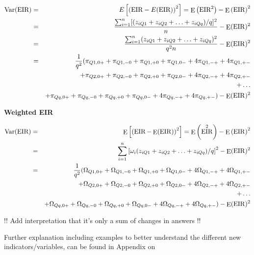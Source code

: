 \documentclass[12pt,a4paper,oneside]{book}
\DeclareMathOperator{\Var}{Var}
\DeclareMathOperator{\E}{E}
\DeclareMathOperator{\EIR}{EIR}
\begin{document}
\begin{eqnarray}
         \Var(\text{EIR}) &=& E \left[ \left(\text{EIR}-E(\text{EIR}) \right)^2 \right] =  \E \left( \text{EIR}^2\right) - \E \left( \text{EIR}\right)^2 \\ 
         &=&  \frac{\sum^n_{i=1}[(z_{iQ1} + z_{iQ2} + \ldots + z_{iQq})/q]^2}{n} - \E (\EIR)^2 \\
        &=&  \frac{\sum^n_{i=1}(z_{iQ1} + z_{iQ2} + \ldots + z_{iQq})^2}{q^2 n} - \E (\EIR)^2 \\
        &=& \frac{1}{q^2} \Large( \pi_{Q1,0+} + \pi_{Q1,-0} + \pi_{Q1,+0} + \pi_{Q1,0-} +4\pi_{Q1,-+} +4\pi_{Q1,+-} \nonumber \\ 
        && + \pi_{Q2,0+} + \pi_{Q2,-0} + \pi_{Q2,+0} + \pi_{Q2,0-} +4\pi_{Q2,-+} +4\pi_{Q2,+-} \nonumber \\ 
        &&  + \ldots \nonumber \\ 
        && + \pi_{Qq,0+} + \pi_{Qq,-0} + \pi_{Qq,+0} + \pi_{Qq,0-} +4\pi_{Qq,-+} +4\pi_{Qq,+-} \Large) - \E (\EIR)^2 \nonumber \\ 
\end{eqnarray}

\textbf{Weighted EIR}

\begin{eqnarray}
         \Var(\text{EIR}) &=& \E \left[ \left( \EIR - \E(\EIR) \right)^2 \right] =  \E \left( \EIR^2\right) - \E \left( \EIR \right)^2 \\ 
         &=&  \sum^n_{i=1} \left[\omega_i (z_{iQ1} + z_{iQ2} + \ldots + z_{iQq})/q \right]^2 - \E (\EIR)^2 \\
        &=& \frac{1}{q^2} \Large( \Omega_{Q1,0+} + \Omega_{Q1,-0} + \Omega_{Q1,+0} + \Omega_{Q1,0-} +4\Omega_{Q1,-+} +4\Omega_{Q1,+-} \nonumber \\ 
        && + \Omega_{Q2,0+} + \Omega_{Q2,-0} + \Omega_{Q2,+0} + \Omega_{Q2,0-} +4\Omega_{Q2,-+} +4\Omega_{Q2,+-} \nonumber \\ 
        &&  + \ldots \nonumber \\ 
        && + \Omega_{Qq,0+} + \Omega_{Qq,-0} + \Omega_{Qq,+0} + \Omega_{Qq,0-} +4\Omega_{Qq,-+} +4\Omega_{Qq,+-} \Large) - \E (\EIR)^2 \nonumber \\ 
\end{eqnarray}

!!
Add interpretation that it's only a sum of changes in answers
!!

Further explanation including examples to better understand the different new indicators/variables, can be found in Appendix on 
\end{document}
